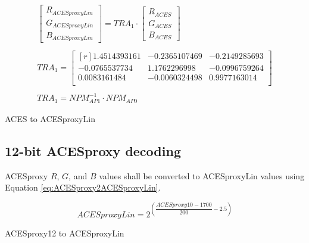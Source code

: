 \begin{floatequ} 
\begin{gather}
    \begin{bmatrix}
        R_{ACESproxyLin}\\
        G_{ACESproxyLin}\\
        B_{ACESproxyLin}
    \end{bmatrix}
    =
    TRA_{1}
    \cdot
    \begin{bmatrix}
        R_{ACES}\\
        G_{ACES}\\
        B_{ACES}
    \end{bmatrix} \\
    \\
    TRA_{1} =
    \begin{bmatrix*}[r]
        1.4514393161 & -0.2365107469 & -0.2149285693 \\
       -0.0765537734 &  1.1762296998 & -0.0996759264 \\
        0.0083161484 & -0.0060324498 &  0.9977163014 \\
    \end{bmatrix*} \\
    \\
    TRA_{1} = NPM^{-1}_{AP1} \cdot NPM_{AP0}
\end{gather}
\caption{ACES to ACESproxyLin}
\label{eq:ACES2ACESproxyLin12}
\end{floatequ}




\subsection{12-bit ACESproxy decoding}
ACESproxy $R$, $G$, and $B$ values shall be converted to ACESproxyLin values using Equation \ref{eq:ACESproxy2ACESproxyLin}.

\begin{floatequ} 
\begin{equation} 
    ACESproxyLin = 2^{\left(\dfrac{ACESproxy10-1700}{200}-2.5\right)}
\end{equation}
\caption{ACESproxy12 to ACESproxyLin}
\label{eq:ACESproxy2ACESproxyLin}
\end{floatequ}


